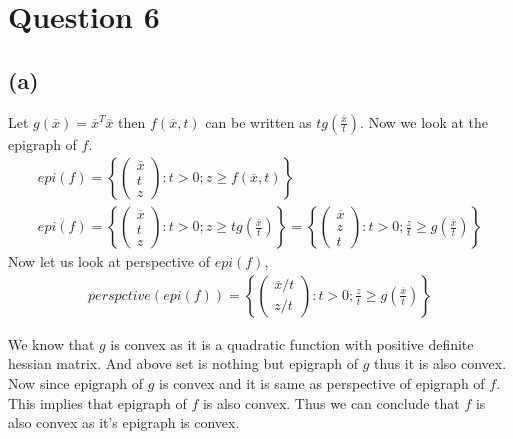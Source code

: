 \documentclass{article}
\begin{document}
\section*{\hfil Question 6}
\subsection*{(a)}
Let $g(\overline{x}) = \overline{x}^T\overline{x}$ then $f(\overline{x}, t)$ can be written as $tg(\frac{\overline{x}}{t})$. Now we look at the epigraph of $f$.
\begin{gather*}
	epi(f) = \left\{\begin{pmatrix}
	\overline{x}\\
	t\\
	z
	\end{pmatrix} : t > 0; z \ge f(\overline{x}, t)\right\}\\
	epi(f) = \left\{\begin{pmatrix}
	\overline{x}\\
	t\\
	z
	\end{pmatrix} : t > 0; z \ge tg\left(\frac{\overline{x}}{t}\right)\right\} = \left\{\begin{pmatrix}
	\overline{x}\\
	z\\
	t
	\end{pmatrix} : t > 0; \frac{z}{t} \ge g\left(\frac{\overline{x}}{t}\right)\right\}
\end{gather*}
Now let us look at perspective of $epi(f)$,
\begin{gather*}
perspctive(epi(f)) = \left\{\begin{pmatrix}
	\overline{x}/t\\
	z/t
	\end{pmatrix} : t > 0; \frac{z}{t} \ge g\left(\frac{\overline{x}}{t}\right)\right\}
\end{gather*}

We know that $g$ is convex as it is a quadratic function with positive definite hessian matrix. And above set is nothing but epigraph of $g$ thus it is also convex. Now since epigraph of $g$ is convex and it is same as perspective of epigraph of $f$. This implies that epigraph of $f$ is also convex. Thus we can conclude that $f$ is also convex as it's epigraph is convex.
\end{document}
